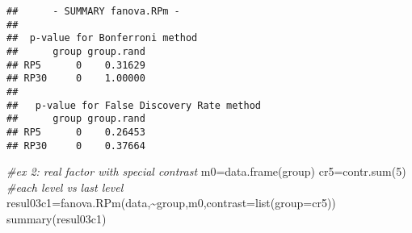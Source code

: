 \documentclass[
]{book}
\newenvironment{Shaded}{\begin{snugshade}}{\end{snugshade}}
\newcommand{\AttributeTok}[1]{\textcolor[rgb]{0.77,0.63,0.00}{#1}}
\newcommand{\CommentTok}[1]{\textcolor[rgb]{0.56,0.35,0.01}{\textit{#1}}}
\newcommand{\DecValTok}[1]{\textcolor[rgb]{0.00,0.00,0.81}{#1}}
\newcommand{\FunctionTok}[1]{\textcolor[rgb]{0.00,0.00,0.00}{#1}}
\newcommand{\NormalTok}[1]{#1}
\newcommand{\OtherTok}[1]{\textcolor[rgb]{0.56,0.35,0.01}{#1}}
\newcommand{\SpecialCharTok}[1]{\textcolor[rgb]{0.00,0.00,0.00}{#1}}
\begin{document}
\begin{Shaded}
\end{Shaded}

\begin{verbatim}
##      - SUMMARY fanova.RPm - 
## 
##  p-value for Bonferroni method 
##      group group.rand
## RP5      0    0.31629
## RP30     0    1.00000
## 
##   p-value for False Discovery Rate method 
##      group group.rand
## RP5      0    0.26453
## RP30     0    0.37664
\end{verbatim}

\begin{Shaded}
\begin{Highlighting}[]
\CommentTok{\#ex 2: real factor with special contrast}
\NormalTok{m0}\OtherTok{=}\FunctionTok{data.frame}\NormalTok{(group)}
\NormalTok{cr5}\OtherTok{=}\FunctionTok{contr.sum}\NormalTok{(}\DecValTok{5}\NormalTok{)   }\CommentTok{\#each level vs last level}
\NormalTok{resul03c1}\OtherTok{=}\FunctionTok{fanova.RPm}\NormalTok{(data,}\SpecialCharTok{\textasciitilde{}}\NormalTok{group,m0,}\AttributeTok{contrast=}\FunctionTok{list}\NormalTok{(}\AttributeTok{group=}\NormalTok{cr5))}
\FunctionTok{summary}\NormalTok{(resul03c1)}
\end{Highlighting}
\end{Shaded}
\end{document}
